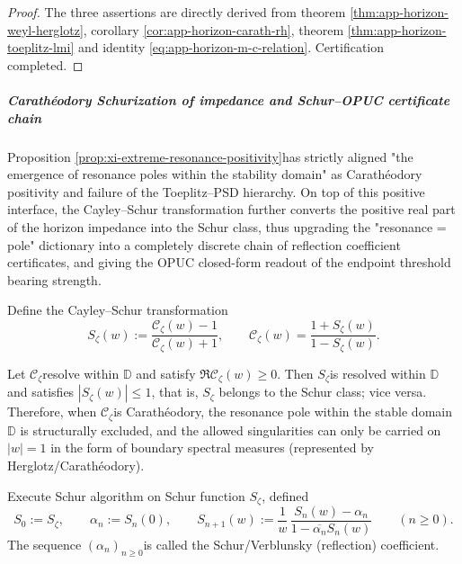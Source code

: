 \begin{proof}
The three assertions are directly derived from theorem \ref{thm:app-horizon-weyl-herglotz}, corollary \ref{cor:app-horizon-carath-rh}, theorem \ref{thm:app-horizon-toeplitz-lmi} and identity \eqref{eq:app-horizon-m-c-relation}. Certification completed.
\end{proof}

\subparagraph{Carath\'eodory Schurization of impedance and Schur--OPUC certificate chain}
Proposition \ref{prop:xi-extreme-resonance-positivity} ​​has strictly aligned "the emergence of resonance poles within the stability domain" as Carath\'eodory positivity and failure of the Toeplitz--PSD hierarchy.
On top of this positive interface, the Cayley--Schur transformation further converts the positive real part of the horizon impedance into the Schur class, thus upgrading the "resonance = pole" dictionary into a completely discrete chain of reflection coefficient certificates, and giving the OPUC closed-form readout of the endpoint threshold bearing strength.
\par
Define the Cayley--Schur transformation
\begin{equation}\label{eq:xi-horizon-cayley-schur}
\boxed{\;
S_{\zeta}(w):=\frac{\mathscr{C}_{\zeta}(w)-1}{\mathscr{C}_{\zeta}(w)+1},
\qquad
\mathscr{C}_{\zeta}(w)=\frac{1+S_{\zeta}(w)}{1-S_{\zeta}(w)}.\;}
\end{equation}

\begin{theorem}\label{thm:xi-horizon-carath-schur-equivalence}
Let \(\mathscr{C}_{\zeta}\) ​​resolve within \(\mathbb{D}\) and satisfy \(\Re \mathscr{C}_{\zeta}(w)\ge 0\).
Then \(S_{\zeta}\) ​​is resolved within \(\mathbb{D}\) and satisfies \(|S_{\zeta}(w)|\le 1\), that is, \(S_{\zeta}\) belongs to the Schur class; vice versa.
Therefore, when \(\mathscr{C}_{\zeta}\) ​​is Carath\'eodory, the resonance pole within the stable domain \(\mathbb{D}\) is structurally excluded, and the allowed singularities can only be carried on \(|w|=1\) in the form of boundary spectral measures (represented by Herglotz/Carath\'eodory).
\end{theorem}

\begin{definition}\label{def:xi-horizon-schur-parameters}
Execute Schur algorithm on Schur function \(S_{\zeta}\), defined
\[
S_0:=S_{\zeta},\qquad \alpha_n:=S_n(0),\qquad
S_{n+1}(w):=\frac{1}{w}\,\frac{S_n(w)-\alpha_n}{1-\overline{\alpha_n}S_n(w)}\qquad(n\ge 0).
\]
The sequence \((\alpha_n)_{n\ge 0}\) ​​is called the Schur/Verblunsky (reflection) coefficient.
\end{definition}

